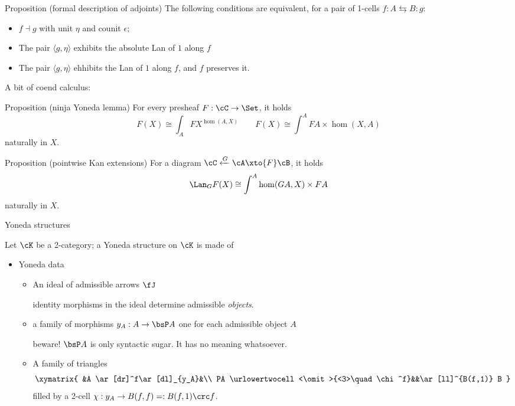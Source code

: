 \documentclass{beamer}
\begin{document}
\begin{frame}
	\begin{block}{Proposition (formal description of adjoints)}
		The following conditions are equivalent, for a pair of 1-cells \(f : A \leftrightarrows B : g\):
		\begin{itemize}
			\item  $f \dashv g$ with unit $\eta$ and counit $\epsilon$;
			\item  The pair $\langle g,\eta\rangle$ exhibits the absolute Lan of $1$ along $f$
			\item  The pair $\langle g,\eta\rangle$ ehhibits the Lan of $1$ along $f$, and $f$ preserves it.
		\end{itemize}
	\end{block}
\end{frame}
\begin{frame}
	A bit of coend calculus:
	\begin{block}{Proposition (ninja Yoneda lemma)}
		For every presheaf $F : \cC\to \Set$, it holds
		\[F(X) \cong \int_{A}FX^{\hom(A,X)} \qquad
			F(X) \cong \int^A FA \times\hom(X,A)\]
		naturally in $X$.
	\end{block}
	\begin{block}{Proposition (pointwise Kan extensions)}
		For a diagram $\cC \xleftarrow{G} \cA \xto{F}\cB$, it holds
		\[\Lan_GF(X)\cong \int^A \hom(GA,X)\times FA\]
		naturally in $X$.
	\end{block}
\end{frame}
\begin{frame}
	\Huge\centering Yoneda structures
\end{frame}
\begin{frame}
	Let $\cK$ be a 2-category; a \alert{Yoneda structure} on $\cK$ is made of\onslide<2->
	\begin{itemize}
		\item \alert{Yoneda data}
		      \begin{itemize}
			      \item<3-> An \alert{ideal} of admissible arrows $\fJ$
			            \begin{center}
				            \scriptsize identity morphisms in the ideal determine admissible \emph{objects}.
			            \end{center}
			      \item<4-> a family of morphisms $y_A : A\to \bsP A$ one for each admissible object $A$
			            \begin{center}
				            \scriptsize beware! $\bsP A$ is only syntactic sugar. It has no meaning whatsoever.
			            \end{center}
			      \item<5-> A family of triangles
			            \[
				            \xymatrix{
					            &A \ar[dr]^f\ar[dl]_{y_A}&\\
					            PA \urlowertwocell<\omit>{<3>\quad\chi^f}&&\ar[ll]^{B(f,1)} B
				            }
			            \]
			            filled by a 2-cell $\chi : y_A \to B(f,f) =: B(f,1)\crc f$.
		      \end{itemize}
	\end{itemize}
\end{frame}
\end{document}
